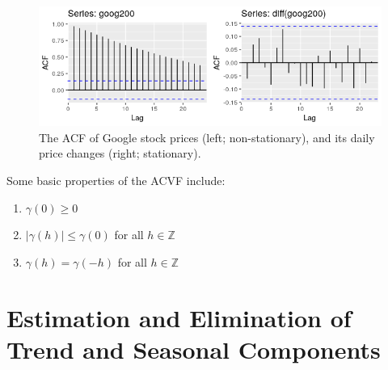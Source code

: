\documentclass[a4paper, oneside]{discothesis}
\begin{document}
\begin{figure}[ht]
\centering
\includegraphics[width=.8\textwidth]{figures/ACF.png}
\caption{The ACF of Google stock prices (left; non-stationary), and its daily price changes (right; stationary). \cite{kdnugget}}
\end{figure}


\begin{theorem}
Some basic properties of the ACVF include:
\begin{enumerate}
    \item $\gamma(0) \geq 0$
    \item $|\gamma(h)| \leq \gamma(0)$ for all $h \in \mathbb{Z}$
    \item $\gamma(h) = \gamma(-h)$ for all $h \in \mathbb{Z}$
\end{enumerate}
\end{theorem}


    
    


\section{Estimation and Elimination of Trend and Seasonal Components}\label{sc:trendseason}
\end{document}
